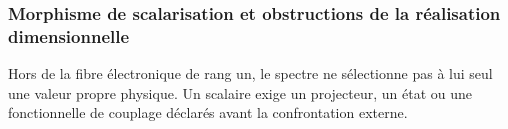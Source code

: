 \let\section\subsection
\let\subsection\subsubsection
\let\subsubsection\paragraph
\let\clearpage\relax

\endgroup
\begingroup
\let\chapter\section
\let\section\subsection
\let\subsection\subsubsection
\let\subsubsection\paragraph
\let\clearpage\relax

\endgroup

\section{Morphisme de scalarisation et obstructions de la réalisation dimensionnelle}
Hors de la fibre électronique de rang un, le spectre ne sélectionne pas à lui seul une valeur propre physique. Un scalaire exige un projecteur, un état ou une fonctionnelle de couplage déclarés avant la confrontation externe.
